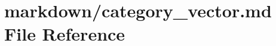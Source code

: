 \hypertarget{category__vector_8md}{}\section{markdown/category\+\_\+vector.md File Reference}
\label{category__vector_8md}
